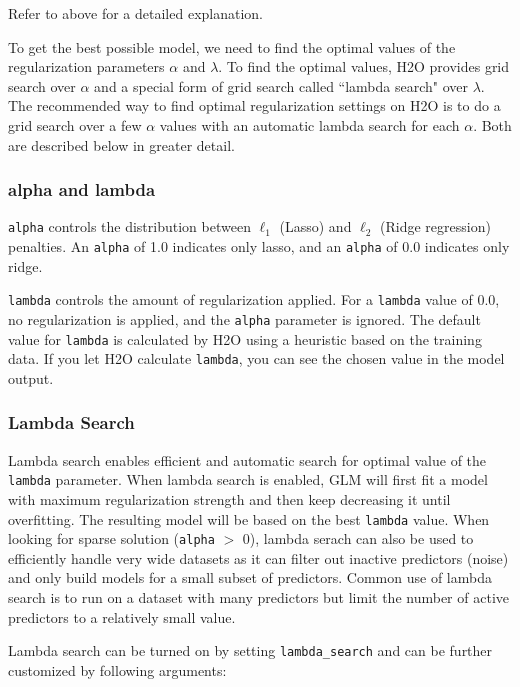 Refer to  above for a detailed explanation.

To get the best possible model, we need to find the optimal values of the regularization parameters $\alpha$ and
$\lambda$.  To find the optimal values, H2O provides grid search over $\alpha$ and a special form of grid search
called ``lambda search" over $\lambda$. The recommended way to find optimal regularization settings on H2O is to do
a grid search over a few $\alpha$ values with an automatic lambda search for each $\alpha$. Both are described
below in greater detail.

\subsubsection{alpha and lambda}

\texttt{alpha} controls the distribution between  $\ell_1$ (Lasso) and  $\ell_2$ (Ridge regression) penalties.  An \texttt{alpha} 
of 1.0 indicates only lasso, and an \texttt{alpha} of 0.0 indicates only ridge.

\texttt{lambda} controls the amount of regularization applied.  For a \texttt{lambda} value of 0.0, no 
regularization is applied, and the \texttt{alpha} parameter is ignored.  The default value for \texttt{lambda} is
calculated by H2O using a heuristic based on the training data.  If you let H2O calculate \texttt{lambda}, you can
see the chosen value in the model output.

\subsubsection{Lambda Search}
Lambda search enables efficient and automatic search for optimal value of the \texttt{lambda} parameter. When lambda search is enabled, GLM will first fit a model with maximum regularization strength and then keep decreasing it until overfitting. The resulting model will be based on the best \texttt{lambda} value. When looking for sparse solution (\texttt{alpha} $>$ 0), lambda serach can also be used to efficiently handle very wide datasets as it can filter out inactive predictors (noise) and only build models for a small subset of predictors. Common use of lambda search is to run on a dataset with many predictors but limit the number of active predictors to a relatively small value.  

Lambda search can be turned on by setting \texttt{lambda\_search} and can be further customized by following arguments:

